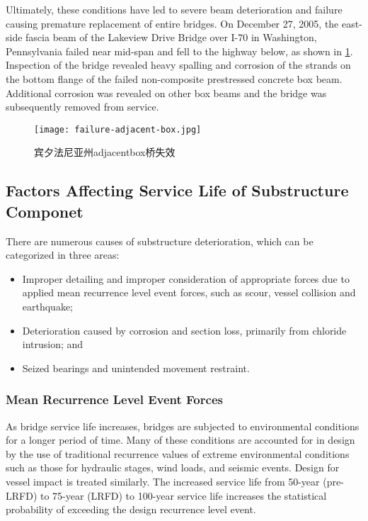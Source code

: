 Ultimately, these conditions have led to severe beam deterioration and failure causing premature replacement of entire bridges. On December 27, 2005, the east-side fascia beam of the Lakeview Drive Bridge over I-70 in Washington, Pennsylvania failed near mid-span and fell to the highway below, as shown in \cref{fig:failure-adjacent-box-beam}. Inspection of the bridge revealed heavy spalling and corrosion of the strands on the bottom flange of the failed non-composite prestressed concrete box beam. Additional corrosion was revealed on other box beams and the bridge was subsequently removed from service.

\begin{figure}
  \texttt{[image: failure-adjacent-box.jpg]}
  \caption{宾夕法尼亚州\gls*{adjacentbox}桥失效}
  \label{fig:failure-adjacent-box-beam}
\end{figure}

\subsection{Factors Affecting Service Life of Substructure Componet}
There are numerous causes of substructure deterioration, which can be categorized in three areas:
\begin{itemize}
  \item Improper detailing and improper consideration of appropriate forces due to applied mean recurrence level event forces, such as scour, vessel collision and earthquake;
  \item Deterioration caused by corrosion and section loss, primarily from chloride intrusion; and
  \item Seized bearings and unintended movement restraint.
\end{itemize}

\subsubsection{Mean Recurrence Level Event Forces}
As bridge service life increases, bridges are subjected to environmental conditions for a longer period of time. Many of these conditions are accounted for in design by the use of traditional recurrence values of extreme environmental conditions such as those for hydraulic stages, wind loads, and seismic events. Design for vessel impact is treated similarly. The increased service life from 50-year (pre-LRFD) to 75-year (LRFD) to 100-year service life increases the statistical probability of exceeding the design recurrence level event.


